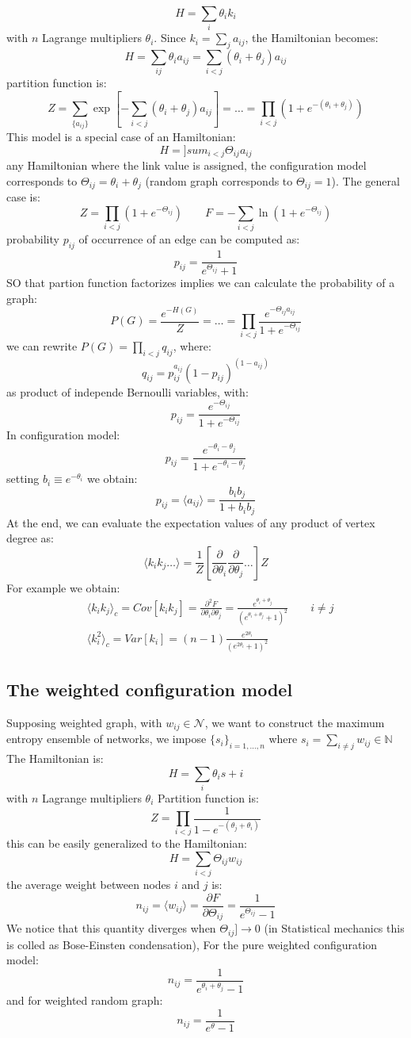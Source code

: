 \[
H = \sum_i \theta_i k_i
\]
with $n$ Lagrange multipliers $\theta_i$. Since $k_i = \sum_j a_{ij}$, the Hamiltonian becomes:
\[
H = \sum_{ij} \theta_i a_{ij} = \sum_{i<j} (\theta_i + \theta_j)a_{ij}
\]
partition function is:
\[
Z = \sum_{\{a_{ij}\}} \exp \left[- \sum_{i<j}(\theta_i + \theta_j)a_{ij}\right] = \ldots = \prod_{i<j} (1 + e^{- (\theta_i + \theta_j)})
\]
This model is a special case of an Hamiltonian:
\[
H = ]sum_{i<j} \Theta_{ij}a_{ij}
\]
any Hamiltonian where the link value is assigned, the configuration model corresponds to $\Theta_{ij} = \theta_i + \theta_j$ (random graph corresponds to $\Theta_{ij} =1$). The general case is:
\[
Z = \prod_{i<j} (1 + e^{-\Theta_{ij}}) \qquad F = - \sum_{i<j} \ln (1 + e^{- \Theta_{ij}})
\]
probability $p_{ij}$ of occurrence of an edge can be computed as:
\[
p_{ij} = \frac{1}{e^{\Theta_{ij}} + 1}
\]
SO that partion function factorizes implies we can calculate the probability of a graph:
\[
P(G) = \frac{e^{-H(G)}}{Z} =\ldots = \prod_{i<j} \frac{e^{- \Theta_{ij}a_{ij}}}{1 + e^{- \Theta_{ij}}}
\]
we can rewrite $P(G) = \prod_{i<j} q_{ij}$, where:
\[
q_{ij} = p_{ij}^{a_{ij}}(1-p_{ij})^{(1-a_{ij})}
\]
as product of independe Bernoulli variables, with:
\[
p_{ij} = \frac{e^{-\Theta_{ij}}}{1 + e^{- \Theta_{ij}}}
\]
In configuration model:
\[
p_{ij} = \frac{e^{- \theta_i - \theta_j}}{1 + e^{-\theta_i - \theta_j}}
\]
setting $b_i \equiv e^{-\theta_i}$ we obtain:
\[
p_{ij} = \langle a_{ij} \rangle = \frac{b_ib_j}{1 + b_i b_j}
\]
At the end, we can evaluate the expectation values of any product of vertex degree as:
\[
\langle k_ik_j\ldots \rangle = \frac{1}{Z} \left[\frac{\partial}{\partial \theta_i}\frac{\partial}{\partial \theta_j}\ldots\right]Z
\]
For example we obtain:
\begin{align*}
&\langle k_ik_j \rangle_c = Cov[k_ik_j] = \frac{\partial^2 F}{\partial \theta_i \partial \theta_j} = \frac{e^{\theta_i + \theta_j}}{(e^{\theta_i + \theta_j} +1)^2} \qquad i\neq j \\
& \langle k_i^2 \rangle_c = Var[k_i] = (n-1)\frac{e^{2\theta_i}}{(e^{2\theta_i}+1)^2}
\end{align*}
\subsection{The weighted configuration model}
Supposing weighted graph, with $w_{ij} \in \mathcal{N}$, we want to construct the maximum entropy ensemble of networks, we impose $\{s_i\}_{i=1,\ldots,n}$ where $s_i = \sum_{i\neq j} w_{ij}\in \mathbb{N}$
The Hamiltonian is:
\[
H = \sum_i \theta_i s+i
\]
with $n$ Lagrange multipliers $\theta_i$
Partition function is:
\[
Z = \prod_{i<j} \frac{1}{1 - e^{-(\theta_j + \theta_i)}}
\]
this can be easily generalized to the Hamiltonian:
\[
H = \sum_{i<j}\Theta_{ij} w_{ij}
\]
the average weight between nodes $i$ and $j$ is:
\[
n_{ij} = \langle w_{ij} \rangle = \frac{\partial F}{\partial \Theta_{ij}}
 = \frac{1}{e^{\Theta_{ij}}-1}
\]
We notice that this quantity diverges when $\Theta_{ij} ]\to 0$ (in Statistical mechanics this is colled as Bose-Einsten condensation), For the pure weighted configuration model:
\[
n_{ij} = \frac{1}{e^{\theta_i + \theta_j} - 1}
\]
and for weighted random graph:
\[
n_{ij} = \frac{1}{e^\theta -1}
\]

